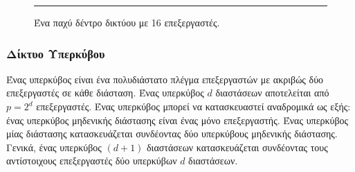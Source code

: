 \documentclass[12pt,a4paper]{article}
\begin{document}
\begin{figure}[H]
\noindent\rule{\textwidth}{0.2pt}
\caption{Ένα παχύ δέντρο δικτύου με 16 επεξεργαστές.}
\label{fig:graph45}
\end{figure}
\vspace{0.3cm}

\subsubsection*{Δίκτυο Υπερκύβου} 
Ένας υπερκύβος είναι ένα πολυδιάστατο πλέγμα επεξεργαστών με ακριβώς δύο 
επεξεργαστές σε κάθε διάσταση. Ένας υπερκύβος $d$ διαστάσεων αποτελείται 
από $p = 2^d$ επεξεργαστές. Ένας υπερκύβος μπορεί να κατασκευαστεί αναδρομικά 
ως εξής: ένας υπερκύβος μηδενικής διάστασης είναι ένας μόνο επεξεργαστής. 
Ένας υπερκύβος μίας διάστασης κατασκευάζεται συνδέοντας δύο υπερκύβους 
μηδενικής διάστασης. Γενικά, ένας υπερκύβος $(d + 1)$ διαστάσεων κατασκευάζεται 
συνδέοντας τους αντίστοιχους επεξεργαστές δύο υπερκύβων $d$ διαστάσεων.
\end{document}

